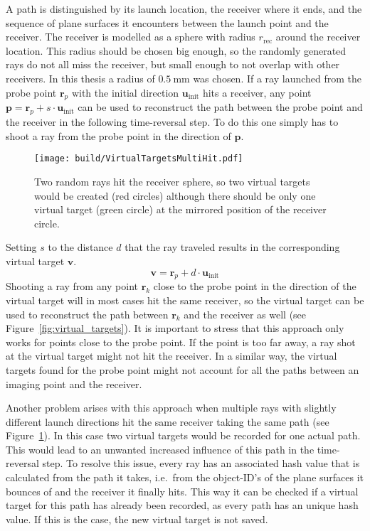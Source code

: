 A path is distinguished by its launch location, the receiver where it ends, and the sequence of plane surfaces it encounters between the launch point and the receiver.
The receiver is modelled as a sphere with radius \(r_{\text{rec}}\) around the receiver location.
This radius should be chosen big enough, so the randomly generated rays do not all miss the receiver, but small enough to not overlap with other receivers.
In this thesis a radius of \(\SI{0.5}{\milli\meter}\) was chosen.
If a ray launched from the probe point \(\bm{r}_p\) with the initial direction \(\bm{u}_{\text{init}}\) hits a receiver, any point \(\bm{p} = \bm{r}_p + s \cdot \bm{u}_{\text{init}}\) can be used to reconstruct the path between the probe point and the receiver in the following time-reversal step.
To do this one simply has to shoot a ray from the probe point in the direction of \(\bm{p}\).

\begin{figure}
    \centering
    \texttt{[image: build/VirtualTargetsMultiHit.pdf]}
    \caption{Two random rays hit the receiver sphere, so two virtual targets would be created (red circles) although there should be only one virtual target (green circle) at the mirrored position of the receiver circle.}\label{fig:mulithit}
\end{figure}

Setting \(s\) to the distance \(d\) that the ray traveled results in the corresponding virtual target \(\bm{v}\).
\begin{equation}\label{eq:visual_target}
    \bm{v} = \bm{r}_p + d \cdot \bm{u}_{\text{init}}
\end{equation}
Shooting a ray from any point \(\bm{r}_k\) close to the probe point in the direction of the virtual target will in most cases hit the same receiver, so the virtual target can be used to reconstruct the path between \(\bm{r}_k\) and the receiver as well  (see Figure~\ref{fig:virtual_targets}).
It is important to stress that this approach only works for points close to the probe point.
If the point is too far away, a ray shot at the virtual target might not hit the receiver.
In a similar way, the virtual targets found for the probe point might not account for all the paths between an imaging point and the receiver.

Another problem arises with this approach when multiple rays with slightly different launch directions hit the same receiver taking the same path (see Figure~\ref{fig:mulithit}).
In this case two virtual targets would be recorded for one actual path.
This would lead to an unwanted increased influence of this path in the time-reversal step.
To resolve this issue, every ray has an associated hash value that is calculated from the path it takes, i.e.~from the object-ID's of the plane surfaces it bounces of and the receiver it finally hits.
This way it can be checked if a virtual target for this path has already been recorded, as every path has an unique hash value.
If this is the case, the new virtual target is not saved.

